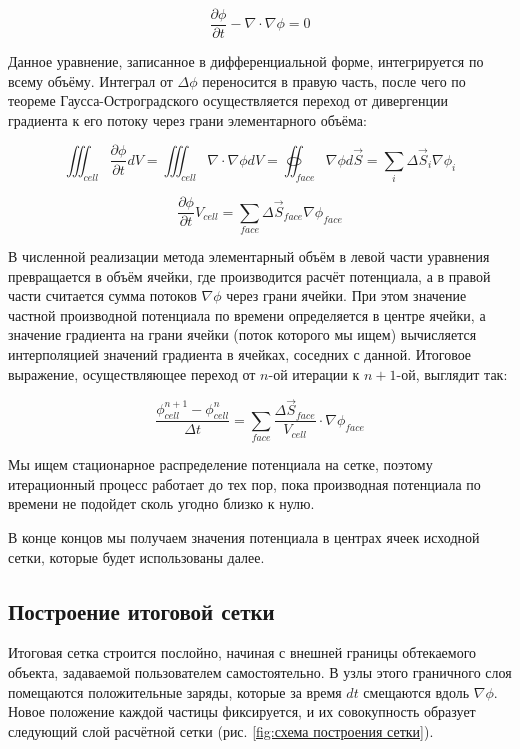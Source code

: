\documentclass[a4paper,12pt]{article}
\begin{document}
\begin{equation}
    \frac{\partial \phi}{\partial t} - \nabla \cdot \nabla \phi = 0
\end{equation}

Данное уравнение, записанное в дифференциальной форме, интегрируется по всему объёму. Интеграл от $\Delta \phi$ переносится в правую часть, после чего по теореме Гаусса-Остроградского осуществляется переход от дивергенции градиента к его потоку через грани элементарного объёма:

\begin{equation}
    \iiint_{cell} \frac{\partial \phi}{\partial t} dV = \iiint_{cell} \nabla \cdot \nabla \phi dV = \oiint_{face} \nabla \phi d \vec S = \sum_i \Delta \vec S_i \nabla \phi_i
\end{equation}

\begin{equation}
    \frac{\partial \phi}{\partial t} V_{cell} = \sum_{face} \Delta \vec S_{face} \nabla \phi_{face}
\end{equation}

В численной реализации метода элементарный объём в левой части уравнения превращается в объём ячейки, где производится расчёт потенциала, а в правой части считается сумма потоков $\nabla \phi$ через грани ячейки. При этом значение частной производной потенциала по времени определяется в центре ячейки, а значение градиента на грани ячейки (поток которого мы ищем) вычисляется интерполяцией значений градиента в ячейках, соседних с данной.
Итоговое выражение, осуществляющее переход от $n$-ой итерации к $n+1$-ой, выглядит так:

\begin{equation}
    \frac{\phi_{cell}^{n+1} - \phi_{cell}^{n}}{\Delta t} = \sum_{face} \frac{\Delta \vec S_{face}}{V_{cell}} \cdot \nabla \phi_{face}
\end{equation}

Мы ищем стационарное распределение потенциала на сетке, поэтому итерационный процесс работает до тех пор, пока производная потенциала по времени не подойдет сколь угодно близко к нулю.

В конце концов мы получаем значения потенциала в центрах ячеек исходной сетки, которые будет использованы далее.

\subsection{Построение итоговой сетки}

Итоговая сетка строится послойно, начиная с внешней границы обтекаемого объекта, задаваемой пользователем самостоятельно. В узлы этого граничного слоя помещаются положительные заряды, которые за время $dt$ смещаются вдоль $\nabla \phi$. Новое положение каждой частицы фиксируется, и их совокупность образует следующий слой расчётной сетки (рис. \ref{fig:схема построения сетки}).
\end{document}
